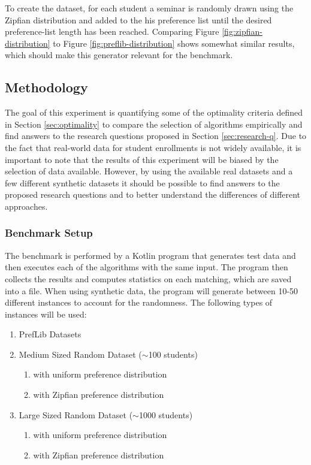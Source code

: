 To create the dataset, for each student a seminar is randomly drawn using the Zipfian distribution and added to the his preference list until the desired preference-list length has been reached. Comparing Figure \ref{fig:zipfian-distribution} to Figure \ref{fig:preflib-distribution} shows somewhat similar results, which should make this generator relevant for the benchmark. 

\subsection{Methodology}
The goal of this experiment is quantifying some of the optimality criteria defined in Section \ref{sec:optimality} to compare the selection of algorithms empirically and find answers to the research questions proposed in Section \ref{sec:research-q}. Due to the fact that real-world data for student enrollments is not widely available, it is important to note that the results of this experiment will be biased by the selection of data available. However, by using the available real datasets and a few different synthetic datasets it should be possible to find answers to the proposed research questions and to better understand the differences of different approaches.

\subsubsection{Benchmark Setup}
The benchmark is performed by a Kotlin program that generates test data and then executes each of the algorithms with the same input. The program then collects the results and computes statistics on each matching, which are saved into a file. When using synthetic data, the program will generate between 10-50 different instances to account for the randomness. The following types of instances will be used:
\begin{enumerate}
  \item PrefLib Datasets
  \item Medium Sized Random Dataset ($\sim$100 students)
  \begin{enumerate}
    \item with uniform preference distribution
    \item with Zipfian preference distribution
  \end{enumerate}
  \item Large Sized Random Dataset ($\sim$1000 students)
  \begin{enumerate}
    \item with uniform preference distribution
    \item with Zipfian preference distribution
  \end{enumerate}
\end{enumerate}

